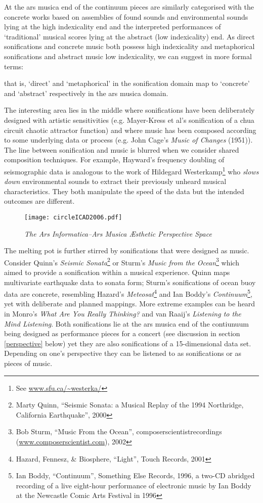 \documentclass{article}
\begin{document}
At the ars musica end of the continuum pieces are similarly categorised with the concrete works based on assemblies of found sounds and environmental sounds lying at the high indexicality end and the interpreted performances of `traditional' musical scores lying at the abstract (low indexicality) end. As direct sonifications and concrete music both possess high indexicality and metaphorical sonifications and abstract music low indexicality, we can suggest in more formal terms: 
 
that is, `direct' and `metaphorical' in the sonification domain map to `concrete' and `abstract' respectively in the ars musica domain.

The interesting area lies in the middle where sonifications have been deliberately designed with artistic sensitivities (e.g. Mayer-Kress et al's \cite{Mayer-Kress:1994} sonification of a chua circuit chaotic attractor function) and where music has been composed according to some underlying data or process (e.g. John Cage's \textit{Music of Changes} (1951)). The line between sonification and music is blurred when we consider shared composition techniques. For example, Hayward's \cite{Hayward:1994} frequency doubling of seismographic data is analogous to the work of Hildegard Westerkamp\footnote{See \url{www.sfu.ca/~westerka/}} who \textit{slows down} environmental sounds to extract their previously unheard musical characteristics. They both manipulate the speed of the data but the intended outcomes are different.
\begin{figure*}[ht] 
\centering
\texttt{[image: circleICAD2006.pdf]} 
\caption{{\it The Ars Informatica--Ars Musica Æsthetic Perspective Space}}   
\label{fig:circle} 
\end{figure*} 

The melting pot is further stirred by sonifications that were designed as music. Consider Quinn's \textit{Seismic Sonata}\footnote{Marty Quinn, ``Seismic Sonata: a Musical Replay of the 1994 Northridge, California Earthquake'', 2000} or Sturm's \textit{Music from the Ocean}\footnote{Bob Sturm, ``Music From the Ocean'', composerscientistrecordings (\url{www.composerscientist.com}), 2002} which aimed to provide a sonification within a musical experience. Quinn maps multivariate earthquake data to sonata form; Sturm's sonifications of ocean buoy data are concrete, resembling Hazard's \textit{Meteosat}\footnote{Hazard, Fennesz, \& Biosphere, ``Light'', Touch Records, 2001} and Ian Boddy's \textit{Continuum}\footnote{Ian Boddy, ``Continuum'', Something Else Records, 1996, a two-CD abridged recording of a live eight-hour performance of electronic music by Ian Boddy at the Newcastle Comic Arts Festival in 1996}, yet with deliberate and planned mappings. More extreme examples can be heard in Monro's \textit{What Are You Really Thinking?} and van Raaij's \textit{Listening to the Mind Listening}. Both sonifications lie at the ars musica end of the contiunuum being designed as performance pieces for a concert (see discussion in section \ref{perspective} below) yet they are also sonifications of a 15-dimensional data set. Depending on one's perspective they can be listened to as sonifications or as pieces of music. 
\end{document}
